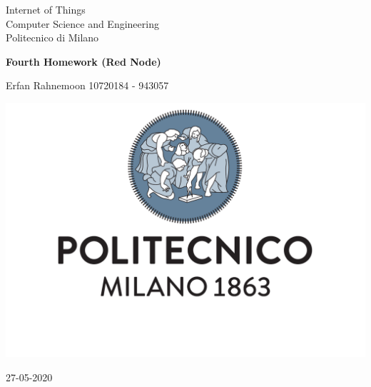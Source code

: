 \documentclass[10pt,english, openany]{book}
\begin{document}

\begin{titlepage}
	\clearpage\thispagestyle{empty}
	\centering
	\vspace{1cm}

	{\normalsize Internet of Things \\ 
		Computer Science and Engineering \\
		Politecnico di Milano \par}
		\vspace{3cm}
	{\Huge \textbf{Fourth Homework (Red Node)}} \\
	\vspace{4cm}
	{\normalsize Erfan Rahnemoon 10720184 - 943057 \par}
	\vspace{5cm}
    
    \centering \includegraphics[scale=0.4]{logo1.pdf}
    
    \vspace{0.5cm}
		
	{\normalsize 27-05-2020 \par}
	

\end{titlepage}

\end{document}
